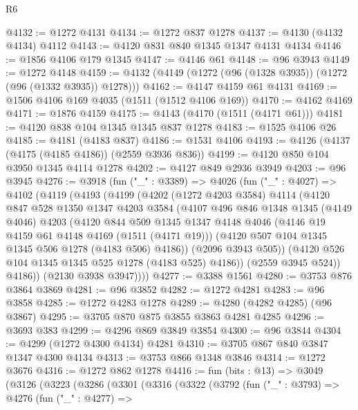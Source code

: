 \begin{lexlean}{R6}
\begin{coremodule}
@4132 := @1272 @4131
@4134 := @1272 @837 @1278
@4137 := @4130 (@4132 @4134) @4112
@4143 := @4120 @831 @840 @1345 @1347 @4131 @4134
@4146 := @1856 @4106 @179 @1345
@4147 := @4146 @61
@4148 := @96 @3943
@4149 := @1272 @4148
@4159 := @4132 (@4149 (@1272 (@96 (@1328 @3935)) (@1272 (@96 (@1332 @3935)) @1278)))
@4162 := @4147 @4159 @61 @4131
@4169 := @1506 @4106 @169 @4035 (@1511 (@1512 @4106 @169))
@4170 := @4162 @4169
@4171 := @1876 @4159
@4175 := @4143 (@4170 (@1511 (@4171 @61)))
@4181 := @4120 @838 @104 @1345 @1345 @837 @1278
@4183 := @1525 @4106 @26
@4185 := @4181 (@4183 @837)
@4186 := @1531 @4106
@4193 := @4126 (@4137 (@4175 (@4185 @4186)) (@2559 @3936 @836))
@4199 := @4120 @850 @104 @3950 @1345 @4114 @1278
@4202 := @4127 @849 @2936 @3949
@4203 := @96 @3945
@4276 := @3918
    (fun ("_" : @3389) =>
    @4026
      (fun ("_" : @4027) =>
      @4102
        (@4119
          (@4193
            (@4199
              (@4202
                (@1272 @4203 @3584)
                @4114
                (@4120
                  @847
                  @528
                  @1350
                  @1347
                  @4203
                  @3584
                  (@4107
                    @496
                    @846
                    @1348
                    @1345
                    (@4149 @4046)
                    @4203
                    (@4120
                      @844
                      @509
                      @1345
                      @1347
                      @4148
                      @4046
                      (@4146 @19 @4159 @61 @4148 @4169 (@1511 (@4171 @19)))
                      (@4120 @507 @104 @1345 @1345 @506 @1278 (@4183 @506) @4186))
                    (@2096 @3943 @505))
                  (@4120 @526 @104 @1345 @1345 @525 @1278 (@4183 @525) @4186))
                (@2559 @3945 @524))
              @4186))
          (@2130 @3938 @3947))))
@4277 := @3388 @1561
@4280 := @3753 @876 @3864 @3869
@4281 := @96 @3852
@4282 := @1272 @4281
@4283 := @96 @3858
@4285 := @1272 @4283 @1278
@4289 := @4280 (@4282 @4285) (@96 @3867)
@4295 := @3705 @870 @875 @3855 @3863 @4281 @4285
@4296 := @3693 @383
@4299 := @4296 @869 @3849 @3854
@4300 := @96 @3844
@4304 := @4299 (@1272 @4300 @4134) @4281
@4310 := @3705 @867 @840 @3847 @1347 @4300 @4134
@4313 := @3753 @866 @1348 @3846
@4314 := @1272 @3676
@4316 := @1272 @862 @1278
@4416 := fun (bits : @13) =>
  @3049
    (@3126
      (@3223
        (@3286
          (@3301
            (@3316
              (@3322
                (@3792
                  (fun ("_" : @3793) =>
                  @4276
                    (fun ("_" : @4277) =>

\end{coremodule}
\end{lexlean}
